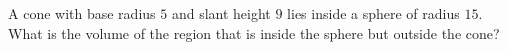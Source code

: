 A cone with base radius $5$ and slant height $9$ lies inside a sphere of radius $15$. What is the volume of the region that is inside the sphere but outside the cone?
